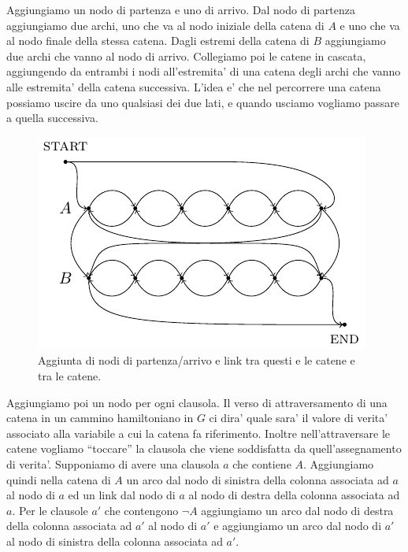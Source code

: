 Aggiungiamo un nodo di partenza e uno di arrivo. Dal nodo di partenza aggiungiamo due archi, uno che
va al nodo iniziale della catena di $A$ e uno che va al nodo finale della stessa catena. Dagli
estremi della catena di $B$ aggiungiamo due archi che vanno al nodo di arrivo. Collegiamo poi le
catene in cascata, aggiungendo da entrambi i nodi all'estremita' di una catena degli archi che vanno
alle estremita' della catena successiva. L'idea e' che nel percorrere una catena possiamo uscire da
uno qualsiasi dei due lati, e quando usciamo vogliamo passare a quella successiva.

\begin{figure}[h]
    \begin{center}
        \includegraphics{./img/NPClass/SATdHAM2.pdf}
        \caption{Aggiunta di nodi di partenza/arrivo e link tra questi e le catene e tra le catene.}
    \end{center}
\end{figure}

Aggiungiamo poi un nodo per ogni clausola. Il verso di attraversamento di una catena in un cammino
hamiltoniano in $G$ ci dira' quale sara' il valore di verita' associato alla variabile a cui la
catena fa riferimento. Inoltre nell'attraversare le catene vogliamo ``toccare'' la clausola che
viene soddisfatta da quell'assegnamento di verita'. Supponiamo di avere una clausola $a$ che
contiene $A$. Aggiungiamo quindi nella catena di $A$ un arco dal nodo di sinistra della colonna
associata ad $a$ al nodo di $a$ ed un link dal nodo di $a$ al nodo di destra della colonna associata
ad $a$. Per le clausole $a'$ che contengono $\lnot A$ aggiungiamo un arco dal nodo di destra della
colonna associata ad $a'$ al nodo di $a'$ e aggiungiamo un arco dal nodo di $a'$ al nodo di sinistra
della colonna associata ad $a'$.

